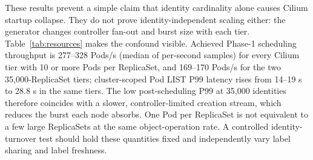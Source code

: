 \documentclass[letterpaper,twocolumn,10pt]{article}
\begin{document}
These results prevent a simple claim that identity cardinality alone
causes Cilium startup collapse. They do not prove identity-independent
scaling either: the generator changes controller fan-out and burst size
with each tier. Table~\ref{tab:resources} makes the confound visible.
Achieved Phase-1 scheduling throughput is 277--328 Pods/s (median of
per-second samples) for every Cilium tier with 10 or more Pods per ReplicaSet,
and 169--170 Pods/s for the two 35,000-ReplicaSet tiers; cluster-scoped
Pod LIST P99 latency rises from 14--19 s to 28.8 s in the same tiers.
The low post-scheduling P99 at 35,000 identities therefore coincides
with a slower, controller-limited creation stream, which reduces the
burst each node absorbs. One Pod per ReplicaSet is not equivalent to a
few large ReplicaSets at the same object-operation rate. A controlled
identity-turnover test should hold these quantities fixed and
independently vary label sharing and label freshness.
\end{document}
